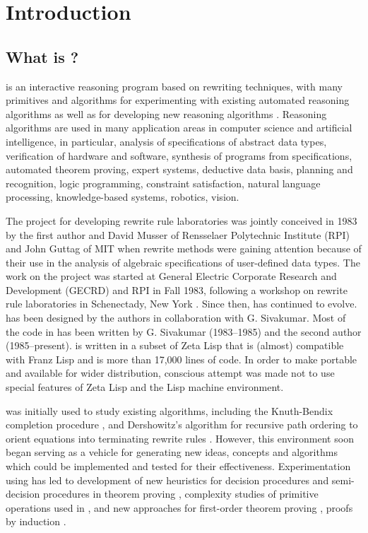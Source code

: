 \tableofcontents
\chapter{Introduction}

\section{What is \ERRL?}

\RRL is an interactive reasoning program based on rewriting techniques,
with many primitives and algorithms
for experimenting with existing automated reasoning algorithms 
as well as for developing new reasoning algorithms
\cite{KapurSiva,KZ881}.  Reasoning
algorithms are used in many application areas in computer science and
artificial intelligence, in particular, analysis of specifications of
abstract data types, verification of hardware and software, synthesis
of programs from specifications, automated theorem proving, expert
systems, deductive data basis, planning and recognition, logic
programming, constraint satisfaction, natural language processing,
knowledge-based systems, robotics, vision.  

The project for developing rewrite rule laboratories was jointly
conceived in 1983 by the first author and David Musser of Rensselaer
Polytechnic Institute (RPI) and John Guttag of MIT when rewrite
methods were gaining attention because of their use in the analysis of
algebraic specifications of user-defined data types.  The work on the
\RRL project was started at General Electric Corporate Research and
Development (GECRD) and RPI in Fall 1983, following a workshop on
rewrite rule laboratories in Schenectady, New York
\cite{Guttagetal84}.  Since then, \RRL has continued to evolve.
\RRL has been designed by the authors in collaboration with G. Sivakumar.
Most of the code in \RRL has been written by G. Sivakumar 
(1983--1985) and
the second author (1985--present). 
\RRL is written in a subset of Zeta Lisp that is (almost) compatible
with Franz Lisp and is more than 17,000 lines of code.  In order to
make \RRL portable and available for wider distribution, conscious
attempt was made not to use special features of Zeta Lisp and the Lisp
machine environment.
 
\RRL was initially used to study existing algorithms, including the
Knuth-Bendix completion procedure \cite{KnuthBendix}, and
Dershowitz's algorithm for recursive path ordering \cite{Dershowitz87}
to orient equations into terminating rewrite
rules \cite{KapurSiva}.  However, this environment soon began serving as a
vehicle for generating new ideas, concepts and algorithms which could
be implemented and tested for their effectiveness.  Experimentation
using \RRL has led to development of new heuristics for decision
procedures and semi-decision procedures in theorem proving
\cite{KMN84,ZK89}, complexity studies of primitive operations
used in \RRL \cite{KN87}, and new approaches for first-order theorem
proving \cite{KN85,ZK88,Zhang88}, proofs by induction
\cite{KNZ86,ZKM88,Zhang88}.

